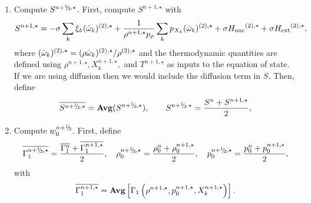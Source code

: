 \begin{description}
\begin{enumerate}
\item Compute $S^{\nph,\star}$.  First, compute $S^{n+1,\star}$ with
\begin{equation}
S^{n+1,\star} =  -\sigma  \sum_k  \xi_k  (\dot{\omega}_k)^{(2),\star}  + 
   \frac{1}{\rho^{n+1,\star} p_\rho} \sum_k p_{X_k}  ({\dot{\omega}}_k)^{(2),\star} + 
   \sigma {H_{\rm nuc}}^{(2),\star} + \sigma {H_{\rm ext}}^{(2),\star},
\end{equation}
  where $(\dot{\omega}_k)^{(2),\star} = (\rho \dot{\omega}_k)^{(2),\star} /
  \rho^{(2),\star}$ and the thermodynamic quantities are defined using
  $\rho^{n+1,\star}, X_k^{n+1,\star},$ and $T^{n+1,\star}$ as inputs to
  the equation of state.  If we are using diffusion then we would include the diffusion
  term in $S$.  Then, define
\begin{equation}
\overline{S^{\nph,\star}} = {\mathrm{\bf Avg}} (S^{\nph,\star}),
\qquad
 S^{\nph.\star} = \frac{S^n + S^{n+1,\star}}{2},
\end{equation}
\item Compute $w_0^{\nph}$.  First, define
\begin{equation}
\overline{\Gamma_1^{\nph,\star}} = \frac{\overline{\Gamma_1^n} + \overline{\Gamma_1^{n+1,\star}}}{2}, 
\quad
\rho_0^{\nph,\star} = \frac{\rho_0^{n} + \rho_0^{n+1,\star}}{2},
\quad
p_0^{\nph,\star} = \frac{p_0^{n} + p_0^{n+1,\star}}{2},
\end{equation}
  with
\begin{equation}
 \overline{\Gamma_1^{n+1,\star}} = {\rm{\bf Avg}} \left[ \Gamma_1\left(\rho^{n+1,\star}, p_0^{n+1,\star}, X_k^{n+1,\star}\right) \right].
\end{equation}


\end{enumerate}
\end{description}
